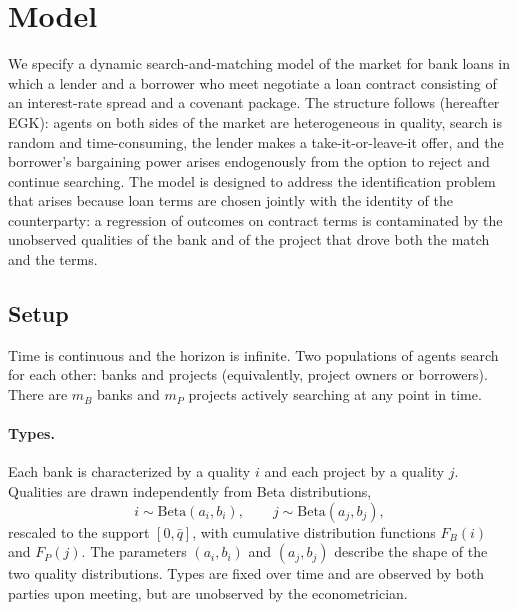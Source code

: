 \documentclass[12pt]{article}
\begin{document}
\section{Model}
\label{sec:model}

We specify a dynamic search-and-matching model of the market for bank loans
in which a lender and a borrower who meet negotiate a loan contract consisting
of an interest-rate spread and a covenant package. The structure follows
\citet{ewens2022} (hereafter EGK): agents on both sides of the market are
heterogeneous in quality, search is random and time-consuming, the lender
makes a take-it-or-leave-it offer, and the borrower's bargaining power arises
endogenously from the option to reject and continue searching. The model is
designed to address the identification problem that arises because loan terms
are chosen jointly with the identity of the counterparty: a regression of
outcomes on contract terms is contaminated by the unobserved qualities of the
bank and of the project that drove both the match and the terms.

\subsection{Setup}
\label{sec:setup}

Time is continuous and the horizon is infinite. Two populations of agents
search for each other: banks and projects (equivalently, project owners or
borrowers). There are $m_B$ banks and $m_P$ projects actively searching at any
point in time.

\paragraph{Types.}
Each bank is characterized by a quality $i$ and each project by a quality $j$.
Qualities are drawn independently from Beta distributions,
\begin{equation}
  i \sim \mathrm{Beta}(a_i, b_i), \qquad j \sim \mathrm{Beta}(a_j, b_j),
  \label{eq:types}
\end{equation}
rescaled to the support $[0, \bar{q}]$, with cumulative distribution functions
$F_B(i)$ and $F_P(j)$. The parameters $(a_i, b_i)$ and $(a_j, b_j)$ describe
the shape of the two quality distributions. Types are fixed over time and are
observed by both parties upon meeting, but are unobserved by the
econometrician.
\end{document}
